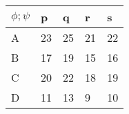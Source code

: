 \begin{minipage}{0.48\textwidth}

    \begin{tabular}{|l|l|l|l|l|}
      \hline
      $\phi;\psi$ & p  & q  & r  & s  \\ \hline
      A           & 23 & 25 & 21 & 22 \\ \hline
      B           & 17 & 19 & 15 & 16 \\ \hline
      C           & 20 & 22 & 18 & 19 \\ \hline
      D           & 11 & 13 & 9  & 10 \\ \hline
    \end{tabular}
  \end{minipage}
